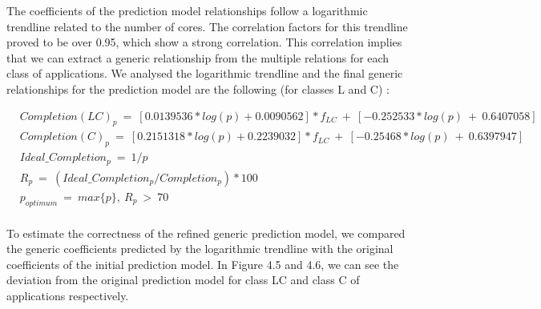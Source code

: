 \documentclass[diploma]{Styles/softlab-thesis}
\begin{document}
The coefficients of the prediction model relationships follow a logarithmic trendline related to the number of cores. The correlation factors for this trendline proved to be over 0.95, which show a strong correlation. This correlation implies that we can extract a generic relationship from the multiple relations for each class of applications. We analysed the logarithmic trendline and the final generic relationships for the prediction model are the following (for classes L and C) : 

\begin{align*}
&Completion(LC)_{p}\ = \ [0.0139536*log(p)+0.0090562]*f_{LC}\ +\ [-0.252533*log(p)\ +\ 0.6407058] \ \\[3pt]
&Completion(C)_{p}\ = \ [0.2151318*log(p)+0.2239032]*f_{LC}\ +\ [-0.25468*log(p)\ +\ 0.6397947] \ \\[3pt]
&Ideal\_Completion_{p}\ =\ 1/p\\[3pt]
&R_{p}\ =\ (Ideal\_Completion_{p} / Completion_{p})*100\\[3pt]
&p_{optimum}\ =\  max\{p\},\ R_{p}\ >\ 70\\[3pt]
\end{align*}

To estimate the correctness of the refined generic prediction model, we compared the generic coefficients predicted by the logarithmic trendline with the original coefficients of the initial prediction model. In Figure 4.5 and 4.6, we can see the deviation from the original prediction model for class LC and class C of applications respectively.
\end{document}
